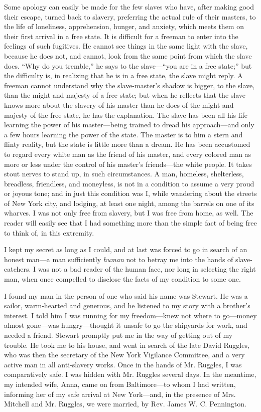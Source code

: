 Some apology can easily be made for the few slaves who have, after
making good their escape, turned back to slavery, preferring the actual
rule of their masters, to the life of loneliness, apprehension, hunger,
and anxiety, which meets them on their first arrival in a free state. It
is difficult for a freeman to enter into the feelings of such fugitives.
He cannot see things in the same light with the slave, because he does
not, and cannot, look from the same point from which the slave does.
``Why do you tremble,'' he says to the slave---``you are in a free
state;'' but the difficulty is, in realizing that he is in a free state,
the slave might reply. A freeman cannot understand why the
slave-master's shadow is bigger, to the slave, than the might and
majesty of a free state; but when he reflects that the slave knows more
about the slavery of his master than he does of the might and majesty of
the free state, he has the explanation. The slave has been all his life
learning the power of his master---being trained to dread his
approach---and only a few hours learning the power of the state. The
master is to him a stern and flinty reality, but the state is little
more than a dream. He has been accustomed to regard every white man as
the friend of his master, and every colored man as more or less under
the control of his {\protect\hypertarget{340}{}{}}master's friends---the
white people. It takes stout nerves to stand up, in such circumstances.
A man, homeless, shelterless, breadless, friendless, and moneyless, is
not in a condition to assume a very proud or joyous tone; and in just
this condition was I, while wandering about the streets of New York
city, and lodging, at least one night, among the barrels on one of its
wharves. I was not only free from slavery, but I was free from home, as
well. The reader will easily see that I had something more than the
simple fact of being free to think of, in this extremity.

I kept my secret as long as I could, and at last was forced to go in
search of an honest man---a man sufficiently \emph{human} not to betray
me into the hands of slave-catchers. I was not a bad reader of the human
face, nor long in selecting the right man, when once compelled to
disclose the facts of my condition to some one.

I found my man in the person of one who said his name was Stewart. He
was a sailor, warm-hearted and generous, and he listened to my story
with a brother's interest. I told him I was running for my
freedom---knew not where to go---money almost gone---was
hungry---thought it unsafe to go the shipyards for work, and needed a
friend. Stewart promptly put me in the way of getting out of my trouble.
He took me to his house, and went in search of the late David Ruggles,
who was then the secretary of the New York Vigilance Committee, and a
very active man in all anti-slavery works. Once in the hands of Mr.
Ruggles, I was comparatively safe. I was
{\protect\hypertarget{341}{}{}}hidden with Mr. Ruggles several days. In
the meantime, my intended wife, Anna, came on from Baltimore---to whom I
had written, informing her of my safe arrival at New York---and, in the
presence of Mrs. Mitchell and Mr. Ruggles, we were married, by Rev.
James W. C. Pennington.

